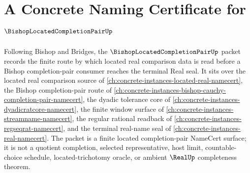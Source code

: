 \chapter{A Concrete Naming Certificate for $\BishopLocatedCompletionPairUp$}
\label{ch:concrete-instances-bishop-located-completion-pair-namecert}

Following Bishop and Bridges, the $\BishopLocatedCompletionPairUp$ packet records the finite route by which located real comparison data is read before a Bishop completion-pair consumer reaches the terminal Real seal. It sits over the located real comparison source of \autoref{ch:concrete-instances-located-real-namecert}, the Bishop completion-pair route of \autoref{ch:concrete-instances-bishop-cauchy-completion-pair-namecert}, the dyadic tolerance core of \autoref{ch:concrete-instances-dyadicratcore-namecert}, the finite window surface of \autoref{ch:concrete-instances-streamname-namecert}, the regular rational readback of \autoref{ch:concrete-instances-regseqrat-namecert}, and the terminal real-name seal of \autoref{ch:concrete-instances-real-namecert}. The packet is a finite located completion-pair NameCert surface; it is not a quotient completion, selected representative, host limit, countable-choice schedule, located-trichotomy oracle, or ambient $\RealUp$ completeness theorem.

